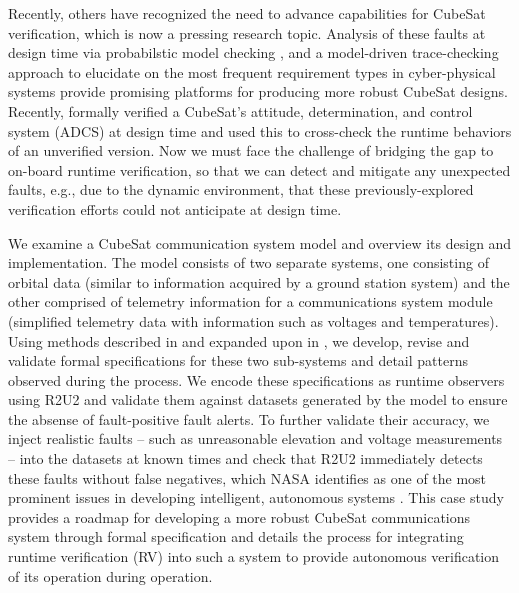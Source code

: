 \documentclass[conf]{new-aiaa}
\begin{document}

Recently, others have recognized the need to advance capabilities for CubeSat verification, which is now a pressing research topic. Analysis of these faults at design time via probabilstic model checking \cite{Peng2013}, and a model-driven trace-checking approach to elucidate on the most frequent requirement types in cyber-physical systems \cite{Boufaied2020} provide promising platforms for producing more robust CubeSat designs. Recently, \cite{Gross2020} formally verified a CubeSat's attitude, determination, and control system (ADCS) at design time and used this to cross-check the runtime behaviors of an unverified version. Now we must face the challenge of bridging the gap to on-board runtime verification, so that we can detect and mitigate any unexpected faults, e.g., due to the dynamic environment, that these previously-explored verification efforts could not anticipate at design time.

We examine a CubeSat communication system model and overview its design and implementation. The model consists of two separate systems, one consisting of orbital data (similar to information acquired by a ground station system) and the other comprised of telemetry information for a communications system module (simplified telemetry data with information such as voltages and temperatures). Using methods described in \cite{Roz16} and expanded upon in \cite{Cauwels2020}, we develop, revise and validate formal specifications for these two sub-systems and detail patterns observed during the process.
We encode these specifications as runtime observers using R2U2 and validate them against datasets generated by the model to ensure the absense of fault-positive fault alerts. To further validate their accuracy, we inject realistic faults -- such as unreasonable elevation and voltage measurements -- into the datasets at known times and check that R2U2 immediately detects these faults without false negatives, which NASA identifies as one of the most prominent issues in developing intelligent, autonomous systems \cite{Roadmap2015}. This case study provides a roadmap for developing a more robust CubeSat communications system through formal specification and details the process for integrating runtime verification (RV) into such a system to provide autonomous verification of its operation during operation.
\end{document}
